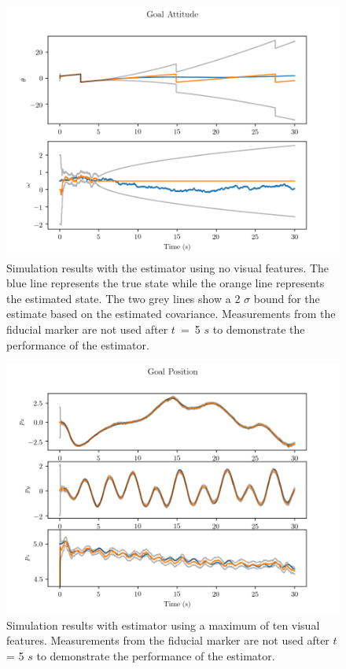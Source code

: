 \begin{figure}
  \centering
  \includegraphics[scale=0.5]{plots/no_lms_gatt.png}
  \caption{Simulation results with the estimator using no visual
  features. The blue line represents the true state while the orange line
  represents the estimated state. The two grey lines show a 2 $\sigma$ bound for
  the estimate based on the estimated covariance. Measurements from the fiducial
  marker are not used after $t$~=~5
$s$ to demonstrate the performance of the estimator.}
  \label{fig:no_lms_gatt}
\end{figure}

\begin{figure}
  \centering
  \includegraphics[scale=0.5]{plots/with_lms_gp.png}
  \caption{Simulation results with estimator using a maximum of ten visual
  features. Measurements from the fiducial marker are not used after $t$ = 5
$s$ to demonstrate the performance of the estimator.}
  \label{fig:with_lms_gp}
\end{figure}

